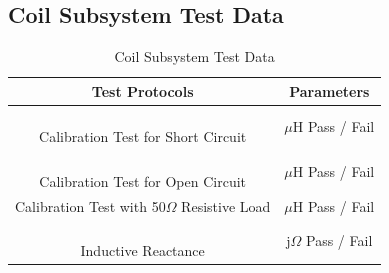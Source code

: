 \documentclass[12pt]{article}
\begin{document}
\subsection{Coil Subsystem Test Data}
\begin{table}[h!]
\centering
\caption*{Coil Subsystem Test Data}
\begin{tabular}{ | c | c | }
\hline
\textbf{Test Protocols} & \textbf{Parameters} \\
\hline
\parbox{0.5\linewidth}{\raggedright \hfill \\[-0.25 em]
Calibration Test for Short Circuit
\hfill \\[0.1 em]} &  \parbox{0.4\linewidth}{\raggedright \hfill \\ [0.7 em] \underline{\hspace{0.625in}} 
$\mu$H
\hspace{0.125 in}Pass \space / \space  Fail \hfill \\ [0.3 em]} \\ 
\hline
\parbox{0.5\linewidth}{\raggedright \hfill \\[-0.25 em]
Calibration Test for Open Circuit
\hfill \\[0.1 em]} &  \parbox{0.4\linewidth}{\raggedright \hfill \\ [0.7 em]\underline{\hspace{0.625in}} 
$\mu$H
\hspace{0.125 in}Pass \space / \space  Fail \hfill \\ [0.3 em]} \\ 
\hline
\parbox{0.5\linewidth}{\raggedright \hfill \\[-0.25 em]
Calibration Test with 50$\Omega$ Resistive Load
\hfill \\[0.1 em]} &  \parbox{0.4\linewidth}{\raggedright \hfill \\ [0.7 em]\underline{\hspace{0.625in}} 
$\mu$H
\hspace{0.125 in}Pass \space / \space  Fail \hfill \\ [0.3 em]} \\ 
\hline
\parbox{0.5\linewidth}{\raggedright \hfill \\[-0.25 em]
Inductive Reactance
\hfill \\[0.1 em]} &  \parbox{0.4\linewidth}{\raggedright \hfill \\ [0.7 em]\underline{\hspace{0.625in}} 
j$\Omega$
\hspace{0.125 in}Pass \space / \space  Fail \hfill \\ [0.3 em]} \\ 

\end{tabular}
\end{table}
\end{document}
